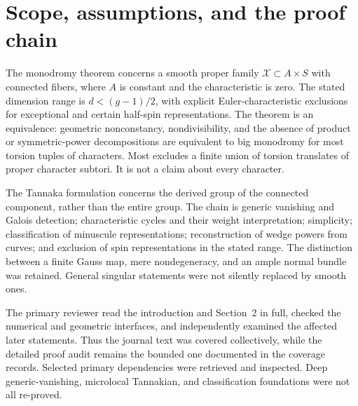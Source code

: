 \documentclass[10pt]{article}
\begin{document}
\section*{Scope, assumptions, and the proof chain}
The monodromy theorem concerns a smooth proper family \(\mathcal X\subset A\times S\) with connected fibers, where \(A\) is constant and the characteristic is zero. The stated dimension range is \(d<(g-1)/2\), with explicit Euler-characteristic exclusions for exceptional and certain half-spin representations. The theorem is an equivalence: geometric nonconstancy, nondivisibility, and the absence of product or symmetric-power decompositions are equivalent to big monodromy for most torsion tuples of characters. Most excludes a finite union of torsion translates of proper character subtori. It is not a claim about every character.\par
The Tannaka formulation concerns the derived group of the connected component, rather than the entire group. The chain is generic vanishing and Galois detection; characteristic cycles and their weight interpretation; simplicity; classification of minuscule representations; reconstruction of wedge powers from curves; and exclusion of spin representations in the stated range. The distinction between a finite Gauss map, mere nondegeneracy, and an ample normal bundle was retained. General singular statements were not silently replaced by smooth ones.\par
The primary reviewer read the introduction and Section 2 in full, checked the numerical and geometric interfaces, and independently examined the affected later statements. Thus the journal text was covered collectively, while the detailed proof audit remains the bounded one documented in the coverage records. Selected primary dependencies were retrieved and inspected. Deep generic-vanishing, microlocal Tannakian, and classification foundations were not all re-proved.\par
\end{document}

